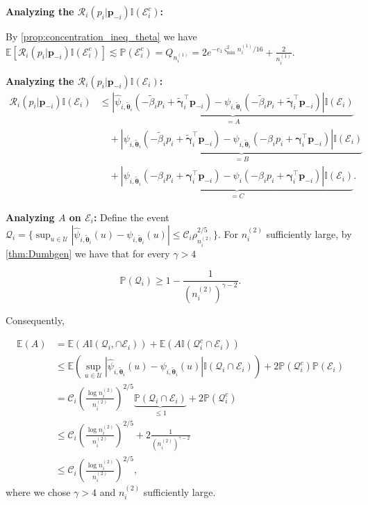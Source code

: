 \documentclass{article} %
\begin{document}
\textbf{Analyzing the $\mathscr{R}_i(p_i|\mathbf{p}_{-i})\mathbb{I}(\mathcal{E}_i^c)$:}

By \cref{prop:concentration_ineq_theta} we have $\mathbb{E}[\mathscr{R}_i(p_i|\mathbf{p}_{-i})\mathbb{I}(\mathcal{E}_i^c)] \lesssim \mathbb{P}(\mathcal{E}_i^c)=Q_{n_i^{(1)}}= 2 e^{-c_{1} \varsigma_{\min}^{2}n_i^{(1)} / 16}+\frac{2}{n_i^{(1)}}$.

\textbf{Analyzing the $\mathscr{R}_i(p_i|\mathbf{p}_{-i})\mathbb{I}(\mathcal{E}_i)$:}
$$
\begin{aligned}\label{ineq:lemma_groeneboom}
\mathscr{R}_i(p_i|\mathbf{p}_{-i})\mathbb{I}(\mathcal{E}_i) & \leq \underset{=A}{\underbrace{|\widehat{\psi}_{i,\widetilde{\boldsymbol{\theta}}_i}( -\widetilde{\beta}_i p_i+\widetilde{\boldsymbol{\gamma}}_i^{\top} \mathbf{p}_{-i})-\psi_{i,\widetilde{\boldsymbol{\theta}}_i}( -\widetilde{\beta}_i p_i+\widetilde{\boldsymbol{\gamma}}_i^{\top} \mathbf{p}_{-i})|\mathbb{I}(\mathcal{E}_i)}} \\
& \quad + \underset{=B}{\underbrace{|\psi_{i,\widetilde{\boldsymbol{\theta}}_i}( -\widetilde{\beta}_i p_i+\widetilde{\boldsymbol{\gamma}}_i^{\top} \mathbf{p}_{-i})-\psi_{i,\widetilde{\boldsymbol{\theta}}_i}( -\beta_i p_i+\boldsymbol{\gamma}_i^{\top} \mathbf{p}_{-i})|\mathbb{I}(\mathcal{E}_i)}} \\
&\quad + \underset{=C}{\underbrace{|\psi_{i,\widetilde{\boldsymbol{\theta}}_i}( -\beta_i p_i+\boldsymbol{\gamma}_i^{\top} \mathbf{p}_{-i})-\psi_i( -\beta_i p_i+\boldsymbol{\gamma}_i^{\top} \mathbf{p}_{-i})|\mathbb{I}(\mathcal{E}_i)}}.
\end{aligned}
$$

\textbf{Analyzing $A$ on $\mathcal{E}_i$:} Define the event $\mathcal{Q}_i = \{ \sup_{u \in \mathcal{U}}|\widehat{\psi}_{i,\widetilde{\boldsymbol{\theta}}_i}(u)-\psi_{i,\widetilde{\boldsymbol{\theta}}_i}(u)|\leq \mathscr{C}_i \rho_{n_i^{(2)}}^{2/5}\}$. For $n_i^{(2)}$ sufficiently large, by \cref{thm:Dumbgen} we have that for every $\gamma >4$

$$
\mathbb{P}(\mathcal{Q}_i)\geq 1-\frac{1}{(n_i^{(2)})^{\gamma-2}}.
$$

Consequently,

$$
\begin{aligned}
\mathbb{E}(A) &= \mathbb{E}(A\mathbb{I}(\mathcal{Q}_i, \cap \mathcal{E}_i)) + \mathbb{E}(A\mathbb{I}(\mathcal{Q}_i^c \cap \mathcal{E}_i)) \\
&\leq \mathbb{E}\left(\sup_{u \in \mathcal{U}}|\widehat{\psi}_{i,\widetilde{\boldsymbol{\theta}}_i}(u)-\psi_{i,\widetilde{\boldsymbol{\theta}}_i}(u)|\mathbb{I}(\mathcal{Q}_i \cap \mathcal{E}_i)\right) + 2\mathbb{P}(\mathcal{Q}_i^c)\mathbb{P}(\mathcal{E}_i)\\
&=\mathscr{C}_i \left(\frac{\log n_i^{(2)}}{n_i^{(2)}}\right)^{2/5}\underset{\leq 1}{\underbrace{\mathbb{P}(\mathcal{Q}_i \cap \mathcal{E}_i)}}+ 2\mathbb{P}(\mathcal{Q}_i^c)\\
&\leq \mathscr{C}_i \left(\frac{\log n_i^{(2)}}{n_i^{(2)}}\right)^{2/5}+ 2\frac{1}{(n_i^{(2)})^{\gamma-2}}\\
&\leq \mathscr{C}_i \left(\frac{\log n_i^{(2)}}{n_i^{(2)}}\right)^{2/5},
\end{aligned}
$$
where we chose $\gamma >4$ and $n_i^{(2)}$ sufficiently large.
\end{document}
